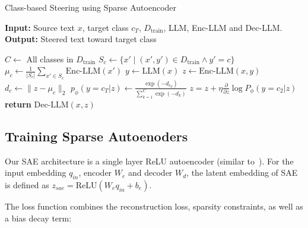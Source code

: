 

\begin{algorithm}
\caption{Class-based Steering using Sparse Autoencoder}\label{alg:steering}
\begin{algorithmic}[1]
\STATE \textbf{Input:} Source text $x$, target class $c_T$,  $D_{\text{train}}$, LLM, Enc-LLM and Dec-LLM. 
\STATE \textbf{Output:} Steered text toward target class

\STATE $C \gets$ All classes in $D_{\text{train}}$
    \STATE $S_c \gets \{x' \mid (x',y') \in D_{\text{train}} \wedge y' = c\}$
    \STATE $\mu_c \gets \frac{1}{|S_c|} \sum_{x'\in S_c} \text{Enc-LLM}(x')$
\ENDFOR
\STATE $y \gets \text{LLM}(x)$
\STATE $z \gets \text{Enc-LLM}(x,y)$
     \STATE $d_c \gets \|z - \mu_c\|_2$ \ENDFOR
    \STATE $p_{\phi}(y = c_T | z) \gets \frac{\exp(-d_{c_T})}{\sum_{k=1}^C \exp(-d_k)}$ 
    \STATE $z = z + \eta\frac{\partial}{\partial z} \log P_{\phi}(y = c_2| z)$   
\ENDWHILE
\STATE \textbf{return} $\text{Dec-LLM}(x,z)$

\end{algorithmic}
\end{algorithm}



\subsection{Training Sparse Autoenoders}
Our SAE architecture is a single layer ReLU autoencoder (similar to~\citet{bricken2023towards}).
For the input embedding $q_{in}$, encoder $W_e$ and decoder $W_d$, the latent embedding of SAE is defined as 
$z_{sae} = \text{ReLU}(W_e q_{in} + b_e)$.

The loss function combines the reconstruction loss, sparsity constraints, as well as a bias decay term:

